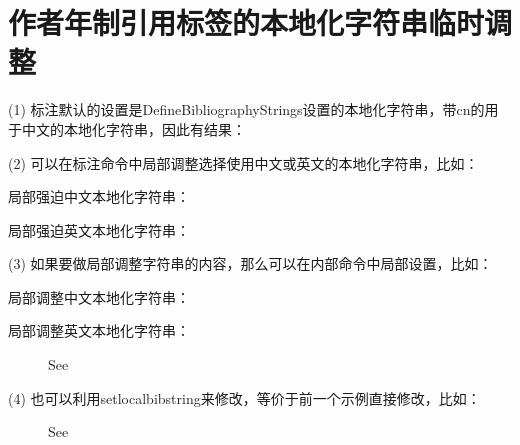 \documentclass[twoside]{article}
\begin{document}
    
\section{作者年制引用标签的本地化字符串临时调整}

(1) 标注默认的设置是DefineBibliographyStrings设置的本地化字符串，带cn的用于中文的本地化字符串，因此有结果：

    {
    \cite{chu2004tushu}
    \cite{chen1980zhongguo}
    \cite{walls2013drought}
    \cite{betts2005aging}
    }
    
(2) 可以在标注命令中局部调整选择使用中文或英文的本地化字符串，比如：

    局部强迫中文本地化字符串：
    
    {
    \cite{chu2004tushu}
    \cite{chen1980zhongguo}
    \cite{walls2013drought}
    \cite{betts2005aging}
    }

    局部强迫英文本地化字符串：
    
    {
    \cite{chu2004tushu}
    \cite{chen1980zhongguo}
    \cite{walls2013drought}
    \cite{betts2005aging}}




(3) 如果要做局部调整字符串的内容，那么可以在内部命令中局部设置，比如：

    局部调整中文本地化字符串：
    
    {%
    \makeatletter{}\makeatother
    \cite{chu2004tushu}
    \cite{chen1980zhongguo}
    \cite{walls2013drought}
    \cite{betts2005aging}}


    局部调整英文本地化字符串：
    
    {%
    \makeatletter{}\makeatother
    \cite{chu2004tushu}
    \cite{chen1980zhongguo}
    \cite{walls2013drought}
    \cite{betts2005aging}}

\begin{figure}[!htbp]
  \centering
    {See{\makeatletter{}\makeatother\cite{walls2013drought}
    \cite{betts2005aging}}}\label{fig:bi:lang}
\end{figure}

(4) 也可以利用setlocalbibstring来修改，等价于前一个示例直接修改，比如：

\begin{figure}[!htbp]
  \centering
    {See{
    \cite{walls2013drought}
    \cite{betts2005aging}}}\label{fig:bi:lang}
\end{figure}




    
\end{document}
